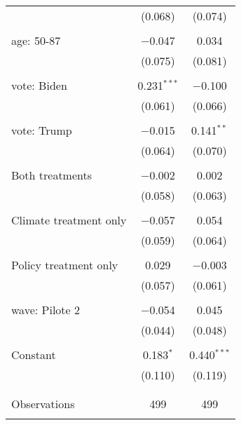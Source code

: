 \begin{tabular}{@{\extracolsep{5pt}}lcc}
  & (0.068) & (0.074) \\ 
  & & \\ 
 age: 50-87 & $-$0.047 & 0.034 \\ 
  & (0.075) & (0.081) \\ 
  & & \\ 
 vote: Biden & 0.231$^{***}$ & $-$0.100 \\ 
  & (0.061) & (0.066) \\ 
  & & \\ 
 vote: Trump & $-$0.015 & 0.141$^{**}$ \\ 
  & (0.064) & (0.070) \\ 
  & & \\ 
 Both treatments & $-$0.002 & 0.002 \\ 
  & (0.058) & (0.063) \\ 
  & & \\ 
 Climate treatment only & $-$0.057 & 0.054 \\ 
  & (0.059) & (0.064) \\ 
  & & \\ 
 Policy treatment only & 0.029 & $-$0.003 \\ 
  & (0.057) & (0.061) \\ 
  & & \\ 
 wave: Pilote 2 & $-$0.054 & 0.045 \\ 
  & (0.044) & (0.048) \\ 
  & & \\ 
 Constant & 0.183$^{*}$ & 0.440$^{***}$ \\ 
  & (0.110) & (0.119) \\ 
  & & \\ 
\hline \\[-1.8ex] 

Observations & 499 & 499 \\ 
\hline 
\hline \\[-1.8ex] 
\end{tabular} 